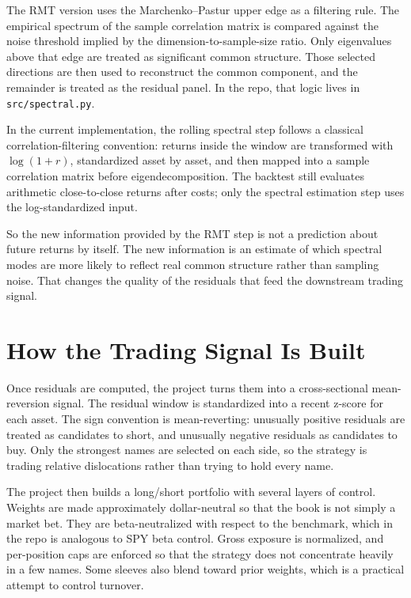 \documentclass[11pt]{article}
\begin{document}
The RMT version uses the Marchenko--Pastur upper edge as a filtering rule. The
empirical spectrum of the sample correlation matrix is compared against the
noise threshold implied by the dimension-to-sample-size ratio. Only eigenvalues
above that edge are treated as significant common structure. Those selected
directions are then used to reconstruct the common component, and the remainder
is treated as the residual panel. In the repo, that logic lives in
\texttt{src/spectral.py}.

In the current implementation, the rolling spectral step follows a classical
correlation-filtering convention: returns inside the window are transformed
with \(\log(1+r)\), standardized asset by asset, and then mapped into a sample
correlation matrix before eigendecomposition. The backtest still evaluates
arithmetic close-to-close returns after costs; only the spectral estimation
step uses the log-standardized input.

So the new information provided by the RMT step is not a prediction about future
returns by itself. The new information is an estimate of which spectral modes
are more likely to reflect real common structure rather than sampling noise.
That changes the quality of the residuals that feed the downstream trading
signal.

\section*{How the Trading Signal Is Built}

Once residuals are computed, the project turns them into a cross-sectional
mean-reversion signal. The residual window is standardized into a recent z-score
for each asset. The sign convention is mean-reverting: unusually positive
residuals are treated as candidates to short, and unusually negative residuals
as candidates to buy. Only the strongest names are selected on each side, so the
strategy is trading relative dislocations rather than trying to hold every name.

The project then builds a long/short portfolio with several layers of control.
Weights are made approximately dollar-neutral so that the book is not simply a
market bet. They are beta-neutralized with respect to the benchmark, which in
the repo is analogous to SPY beta control. Gross exposure is normalized,
and per-position caps are enforced so that the strategy does not concentrate
heavily in a few names. Some sleeves also blend toward prior weights, which is a
practical attempt to control turnover.
\end{document}
